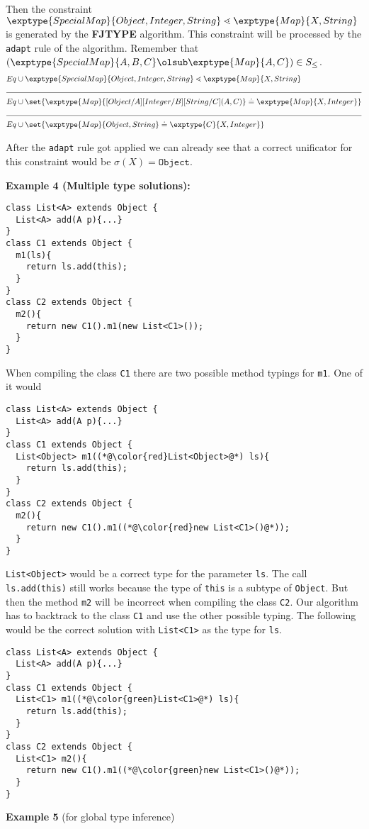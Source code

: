 Then the constraint $\exptype{SpecialMap}{Object,Integer,String} \lessdot \exptype{Map}{X,String}$
is generated by the \textbf{FJTYPE} algorithm.
This constraint will be processed by the \texttt{adapt} rule of the \unify{} algorithm.
Remember that $(\exptype{SpecialMap}{A,B,C} \olsub \exptype{Map}{A,C}) \in S_\leq$.
\begin{align*}
  Eq& \cup \exptype{SpecialMap}{Object,Integer,String} \lessdot \exptype{Map}{X,String} \\
  \cline{1-2} 
  Eq& \cup \set{\exptype{Map}{[ Object / A ][ Integer / B ][ String / C ](A,C)}
  \doteq \exptype{Map}{X,Integer}} \\
  \cline{1-2} 
  Eq& \cup \set{\exptype{Map}{Object,String}
  \doteq \exptype{C}{X, Integer}}
\end{align*}

After the \texttt{adapt} rule got applied we can already see that a correct unificator for this constraint would be
$\sigma(X) = \texttt{Object}$.

\textbf{Example 4 (Multiple type solutions):}
\begin{lstlisting}
class List<A> extends Object {
  List<A> add(A p){...}
}
class C1 extends Object {
  m1(ls){
    return ls.add(this);
  }
}
class C2 extends Object {
  m2(){
    return new C1().m1(new List<C1>());
  }
}
\end{lstlisting}
When compiling the class \texttt{C1} there are two possible method typings for \texttt{m1}.
One of it would 
\begin{lstlisting}
class List<A> extends Object {
  List<A> add(A p){...}
}
class C1 extends Object {
  List<Object> m1((*@\color{red}List<Object>@*) ls){
    return ls.add(this);
  }
}
class C2 extends Object {
  m2(){
    return new C1().m1((*@\color{red}new List<C1>()@*));
  }
}
\end{lstlisting}
\texttt{List<Object>} would be a correct type for the parameter \texttt{ls}.
The call \texttt{ls.add(this)} still works because the type of \texttt{this} is a subtype of \texttt{Object}.
But then the method \texttt{m2} will be incorrect when compiling the class \texttt{C2}.
Our algorithm has to backtrack to the class \texttt{C1} and use the other possible typing.
The following would be the correct solution with \texttt{List<C1>} as the type for \texttt{ls}.
\begin{lstlisting}
class List<A> extends Object {
  List<A> add(A p){...}
}
class C1 extends Object {
  List<C1> m1((*@\color{green}List<C1>@*) ls){
    return ls.add(this);
  }
}
class C2 extends Object {
  List<C1> m2(){
    return new C1().m1((*@\color{green}new List<C1>()@*));
  }
}
\end{lstlisting}

\textbf{Example 5} (for global type inference)
\begin{lstlisting}

\end{lstlisting}